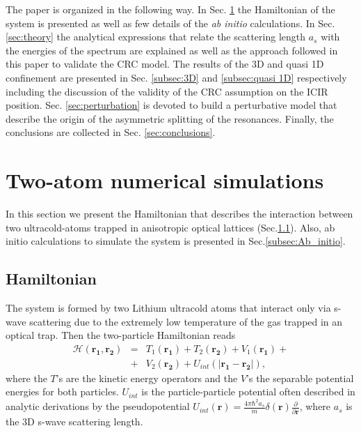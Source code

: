 \documentclass[aps,pre,twocolumn,superscriptaddress,showpacs]{revtex4-1}
\newcommand{\abinitio}{\textit{ab initio }}
\newcommand{\bfeq}[1]{{\boldsymbol{#1}}}
\begin{document}
The paper is organized in the following way. In Sec. \ref{sec:system} the Hamiltonian of the system is presented as well as few details of the \abinitio calculations. In Sec. \ref{sec:theory} the analytical expressions that relate the scattering length $a_s$ with the energies of the spectrum are explained as well as the approach followed in this paper to validate the CRC model. The results of the 3D and quasi 1D confinement are presented in Sec. \ref{subsec:3D} and \ref{subsec:quasi 1D} respectively including the discussion of the validity of the CRC assumption on the ICIR position. Sec. \ref{sec:perturbation} is devoted to build a perturbative model that describe the origin of the asymmetric splitting of the resonances. Finally, the conclusions are collected in Sec. \ref{sec:conclusions}.
 
\section{Two-atom numerical simulations}  \label{sec:system}
In this section we present the Hamiltonian that describes the interaction between two ultracold-atoms trapped in anisotropic optical lattices (Sec.\ref{subsec:H}). Also, ab initio calculations to 
simulate the system is presented in Sec.\ref{subsec:Ab_initio}.

\subsection{Hamiltonian} \label{subsec:H}
The system is formed by two Lithium ultracold atoms that interact only via s-wave scattering due to the extremely low temperature of the gas trapped in an optical trap. Then the two-particle Hamiltonian reads
\begin{eqnarray}
\label{eq:Hamiltonian cartesians}
\mathcal{H}(\bfeq{r_1}, \bfeq{r_2}) &=& T_1(\bfeq{r_1}) + T_2(\bfeq{r_2}) + V_1(\bfeq{r_1}) +  \nonumber \\ 
&+& V_2(\bfeq{r_2}) + U_{int}(|\bfeq{r_1} - \bfeq{r_2}|),
\end{eqnarray}
where the $T$'s are the kinetic energy operators and the $V$'s the separable potential energies for both particles.  $U_{int}$ is the particle-particle potential often described in analytic derivations by the pseudopotential $U_{int}(\bfeq{r}) = \frac{4\pi \hbar^2 a_s}{m} \delta(\bfeq{r})\frac{\partial}{\partial \bfeq{r}}$, where $a_s$ is the 3D s-wave scattering length.
\end{document}
